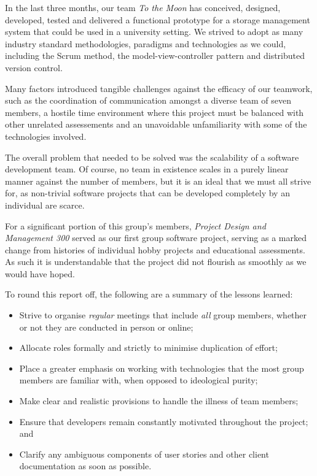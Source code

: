 \documentclass[a4paper,titlepage,12pt]{article}
\begin{document}
In the last three months, our team \textit{To the Moon} has conceived,
designed, developed, tested and delivered a functional prototype for a storage
management system that could be used in a university setting. We strived to
adopt as many industry standard methodologies, paradigms and technologies as
we could, including the Scrum method, the model-view-controller pattern and
distributed version control.

Many factors introduced tangible challenges against the efficacy of our
teamwork, such as the coordination of communication amongst a diverse team of
seven members, a hostile time environment where this project must be balanced
with other unrelated assessements and an unavoidable unfamiliarity with some of
the technologies involved.

The overall problem that needed to be solved was the scalability of a software
development team. Of course, no team in existence scales in a purely linear
manner against the number of members, but it is an ideal that we must all
strive for, as non-trivial software projects that can be developed completely
by an individual are scarce.

For a significant portion of this group's members, \textit{Project Design and
Management 300} served as our first group software project, serving as a marked
change from histories of individual hobby projects and educational assessments.
As such it is understandable that the project did not flourish as smoothly as
we would have hoped.

To round this report off, the following are a summary of the lessons learned:

\begin{itemize}
	\item Strive to organise \textit{regular} meetings that include
	      \textit{all} group members, whether or not they are
	      conducted in person or online;
	\item Allocate roles formally and strictly to minimise duplication of
	      effort;
	\item Place a greater emphasis on working with technologies that the
	      most group members are familiar with, when opposed to ideological
	      purity;
	\item Make clear and realistic provisions to handle the illness of team
	      members;
	\item Ensure that developers remain constantly motivated throughout the
	      project; and
	\item Clarify any ambiguous components of user stories and other client
	      documentation as soon as possible.
\end{itemize}

\begin{sloppypar}
	\printbibliography
\end{sloppypar}
\end{document}
